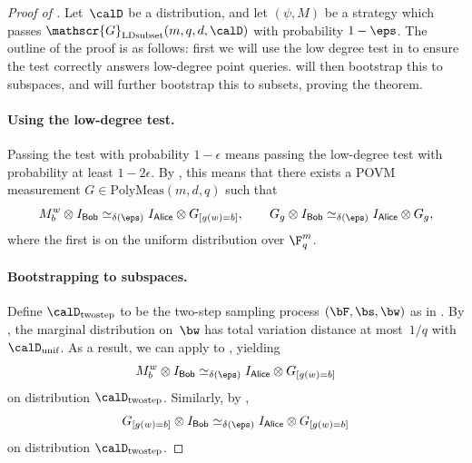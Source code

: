 \documentclass[11pt]{article}
\newcommand{\consistency}{\simeq}
\newcommand{\polymeas}[3]{\mathrm{PolyMeas}(#1,#2,#3)}
\newcommand{\game}{\mathscr{G}}
\newcommand{\reg}[1]{{\mathsf{#1}}}
\begin{document}
\begin{proof}[Proof of ]
Let~$\calD$ be a distribution,
and let $(\psi, M)$ be a strategy which passes $\game_{\mathrm{LDsubset}}(m, q, d, \calD)$ with probability $1-\eps$.
The outline of the proof is as follows:
first we will use the low degree test in  to ensure the test correctly answers low-degree point queries.
 will then bootstrap this to subspaces,
and  will further bootstrap this to subsets, proving the theorem.

\paragraph{Using the low-degree test.}
Passing the test with probability $1-\epsilon$ means passing the low-degree test with probability at least $1-2\epsilon$.
By , this means that there exists a POVM measurement $G \in \polymeas{m}{d}{q}$ such that
\begin{equation}\label{eq:just-applied-low-degree}
M^w_b \otimes I_{\reg{Bob}} \consistency_{\delta(\eps)} I_{\reg{Alice}} \otimes G_{[g(w) = b]},
\qquad G_g \otimes I_{\reg{Bob}} \consistency_{\delta(\eps)} I_{\reg{Alice}} \otimes G_g,
\end{equation}
where the first is on the uniform distribution over $\F_q^m$.

\paragraph{Bootstrapping to subspaces.}
Define $\calD_{\mathrm{twostep}}$ to be the two-step sampling process $(\bF, \bs, \bw)$ as in .
By , the marginal distribution on~$\bw$ has total variation distance at most~$1/q$ with $\calD_{\mathrm{unif}}$.
As a result, we can apply  to , yielding
\begin{equation}\label{eq:gonna-triangle-the-shit-outta-this}
M^w_b \otimes I_{\reg{Bob}} \consistency_{\delta(\eps)} I_{\reg{Alice}} \otimes G_{[g(w) = b]}
\end{equation}
on distribution $\calD_{\mathrm{twostep}}$.
Similarly, by ,
\begin{equation}\label{eq:incoming-triangle}
G_{[g(w) = b]} \otimes I_{\reg{Bob}} \consistency_{\delta(\eps)} I_{\reg{Alice}} \otimes G_{[g(w) = b]}
\end{equation}
on distribution $\calD_{\mathrm{twostep}}$.



\end{proof}
\end{document}
